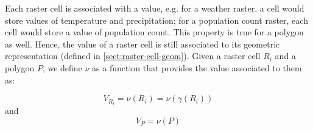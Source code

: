 Each raster cell is associated with a value, e.g. for a weather raster, a cell would store values of temperature and precipitation; for a population count raster, each cell would store a value of population count. This property is true for a polygon as well. Hence, the value of a raster cell is still associated to its geometric representation (defined in \ref{sect:raster-cell-geom}). Given a raster cell $R_i$ and a polygon $P$, we define $\nu$ as a function that provides the value associated to them as:

\begin{equation*}
    V_{R_i} = \nu(R_i) = \nu(\gamma(R_i))
\end{equation*}
and
\begin{equation*}
    V_P = \nu(P)
\end{equation*}
